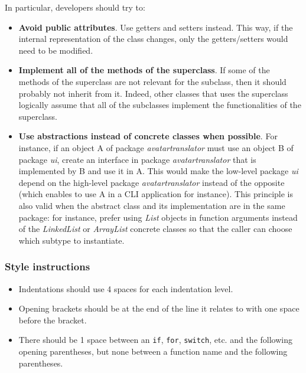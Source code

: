 \documentclass[12pt]{article}
\begin{document}
In particular, developers should try to:
\begin{itemize}
    \item \textbf{Avoid public attributes}. Use getters and setters instead.
        This way, if the internal representation of the class changes, only the
        getters/setters would need to be modified.
    \item \textbf{Implement all of the methods of the superclass}.
        If some of the methods of the superclass are not relevant for the
        subclass, then it should probably not inherit from it. Indeed, other
        classes that uses the superclass logically assume that all of the
        subclasses implement the functionalities of the superclass.
    \item \textbf{Use abstractions instead of concrete
        classes when possible}. For instance, if an object A of package
        \textit{avatartranslator} must use an object B of package \textit{ui},
        create an interface in package \textit{avatartranslator} that is
        implemented by B and use it in A. This would make the low-level package
        \textit{ui} depend on the high-level package \textit{avatartranslator}
        instead of the opposite (which enables to use A in a CLI application for
        instance). This principle is also valid when the abstract class and its
        implementation are in the same package: for instance, prefer using
        \textit{List} objects in function arguments instead of the
        \textit{LinkedList} or \textit{ArrayList} concrete classes so that the
        caller can choose which subtype to instantiate.
\end{itemize}

\subsubsection{Style instructions}

\begin{itemize}
\item Indentations should use 4 spaces for each indentation level.
\item Opening brackets should be at the end of the line it relates to with one
    space before the bracket.
\item There should be 1 space between an \texttt{if}, \texttt{for},
    \texttt{switch}, etc. and the following opening parentheses, but none
        between a function name and the following parentheses.
\end{itemize}
\end{document}
